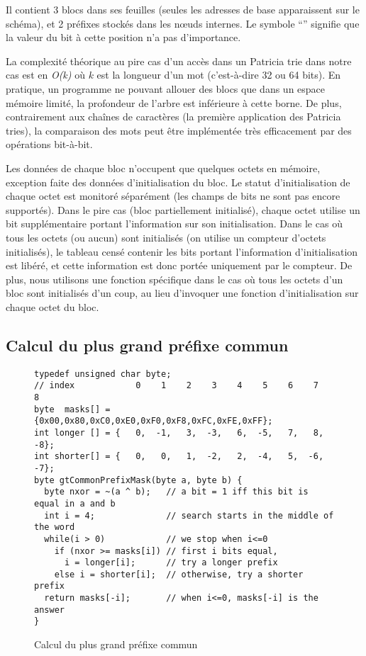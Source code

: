\documentclass[french]{spimufcphdthesis}
\begin{document}
Il contient 3 blocs dans ses feuilles (seules les adresses de base apparaissent
sur le schéma), et 2 préfixes stockés dans les n\oe{}uds internes. Le symbole
``{\tt *}'' signifie que la valeur du bit à cette position n'a pas d'importance.

La complexité théorique au pire cas d'un accès dans un Patricia trie dans notre
cas est en {\em O(k)} où $k$ est la longueur d'un mot (c'est-à-dire 32 ou 64
bits). En pratique, un programme ne pouvant allouer des blocs que dans un
espace mémoire limité, la profondeur de l'arbre est inférieure à cette borne.
De plus, contrairement aux chaînes de caractères (la première application des
Patricia tries), la comparaison des mots peut être implémentée très
efficacement par des opérations bit-à-bit.

Les données de chaque bloc n'occupent que quelques octets en mémoire, exception
faite des données d'initialisation du bloc. Le statut d'initialisation de chaque
octet est monitoré séparément
(les champs de bits ne sont pas encore supportés). Dans le pire cas (bloc
partiellement initialisé), chaque octet utilise un bit supplémentaire portant
l'information sur son initialisation. Dans le cas où tous les octets (ou aucun)
sont initialisés (on utilise un compteur d'octets initialisés), le tableau
censé contenir les bits portant l'information d'initialisation est libéré, et
cette information est donc portée uniquement par le compteur. De plus, nous
utilisons une fonction spécifique dans le cas où tous les octets d'un bloc sont
initialisés d'un coup, au lieu d'invoquer une fonction d'initialisation sur
chaque octet du bloc.


\subsection{Calcul du plus grand préfixe commun}


\begin{figure}[h]
\begin{lstlisting}
typedef unsigned char byte;
// index            0    1    2    3    4    5    6    7    8
byte  masks[] = {0x00,0x80,0xC0,0xE0,0xF0,0xF8,0xFC,0xFE,0xFF};
int longer [] = {   0,  -1,   3,  -3,   6,  -5,   7,   8,  -8};
int shorter[] = {   0,   0,   1,  -2,   2,  -4,   5,  -6,  -7};
byte gtCommonPrefixMask(byte a, byte b) {
  byte nxor = ~(a ^ b);   // a bit = 1 iff this bit is equal in a and b
  int i = 4;              // search starts in the middle of the word
  while(i > 0)            // we stop when i<=0
    if (nxor >= masks[i]) // first i bits equal,
      i = longer[i];      // try a longer prefix 
    else i = shorter[i];  // otherwise, try a shorter prefix 
  return masks[-i];       // when i<=0, masks[-i] is the answer
}
\end{lstlisting}
\caption{Calcul du plus grand préfixe commun}
\label{fig:prefix}
\end{figure}
\end{document}
